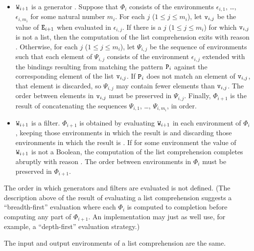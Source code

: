 \begin{itemize}
\item ${\tt{\sl W}}_{i+1}$ is a generator .
Suppose that $\Phi_i$ consists of the environments $\epsilon_{i,1}$,
\ldots, $\epsilon_{i,m_i}$ for some natural number $m_i$.  For each
$j$ ($1\leq j\leq m_i$), let ${\tt{\sl v}}_{i,j}$ be the value of
${\tt{\sl E}}_{i+1}$ when evaluated in $\epsilon_{i,j}$.
If there is a $j$ ($1\leq j\leq m_i$) for which ${\tt{\sl v}}_{i,j}$ is not a list,
then the computation of the list comprehension exits
with reason .  Otherwise, for each $j$ ($1\leq j\leq m_i$),
let $\Psi_{i,j}$ be the sequence of environments such that each
element of $\Psi_{i,j}$ consists of the environment $\epsilon_{i,j}$ extended
with the bindings resulting from matching the pattern ${\tt{\sl P}}_i$
against the corresponding element of the list ${\tt{\sl v}}_{i,j}$.
If ${\tt{\sl P}}_i$ does not match an element of ${\tt{\sl v}}_{i,j}$, that
element is discarded, so
$\Psi_{i,j}$ may contain fewer elements than ${\tt{\sl v}}_{i,j}$.  The order between
elements in ${\tt{\sl v}}_{i,j}$ must be preserved in $\Psi_{i,j}$.  Finally, 
$\Phi_{i+1}$ is the result of concatenating the sequences
$\Psi_{i,1}$, \ldots, $\Psi_{i,m_i}$, in order.

\item ${\tt{\sl W}}_{i+1}$ is a filter.
$\Phi_{i+1}$ is obtained by evaluating ${\tt{\sl W}}_{i+1}$ in each
environment of $\Phi_i$, keeping those environments in which the
result is  and discarding those environments in which the
result is .  If for some environment the value of
${\tt{\sl W}}_{i+1}$ is not a Boolean, the computation of the list
comprehension completes abruptly with reason
\ifStd{}\else{}\fi.  The order between
environments in $\Phi_i$ must be preserved in $\Phi_{i+1}$.
\end{itemize}

\ifStd
{}
The order in which generators and filters are evaluated is not
defined.
(The description above of the result of evaluating a list comprehension
suggests a ``breadth-first'' evaluation where each $\Phi_i$ is computed
to completion before computing any part of $\Phi_{i+1}$.  An implementation
may just as well use, for example, a ``depth-first'' evaluation strategy.)
\fi
{}

\ENVIRONMENTS

The input and output environments of a list comprehension are the same.

